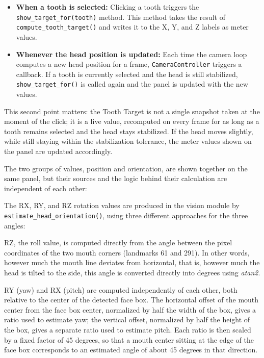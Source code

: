 \begin{itemize}
    \item \textbf{When a tooth is selected:} Clicking a tooth triggers the \texttt{show\_target\_for(tooth)} method. This method takes the result of \texttt{compute\_tooth\_target()} and writes it to the X, Y, and Z labels as meter values.
    \item \textbf{Whenever the head position is updated:} Each time the camera loop computes a new head position for a frame, \texttt{CameraController} triggers a callback. If a tooth is currently selected and the head is still stabilized, \texttt{show\_target\_for()} is called again and the panel is updated with the new values.
\end{itemize}

This second point matters: the Tooth Target is not a single snapshot taken at the moment of the click; it is a live value, recomputed on every frame for as long as a tooth remains selected and the head stays stabilized. If the head moves slightly, while still staying within the stabilization tolerance, the meter values shown on the panel are updated accordingly.

The two groups of values, position and orientation, are shown together on the same panel, but their sources and the logic behind their calculation are independent of each other:

The RX, RY, and RZ rotation values are produced in the vision module by \texttt{estimate\_head\_orientation()}, using three different approaches for the three angles:

RZ, the roll value, is computed directly from the angle between the pixel coordinates of the two mouth corners (landmarks 61 and 291). In other words, however much the mouth line deviates from horizontal, that is, however much the head is tilted to the side, this angle is converted directly into degrees using \textit{atan2}.

RY (yaw) and RX (pitch) are computed independently of each other, both relative to the center of the detected face box. The horizontal offset of the mouth center from the face box center, normalized by half the width of the box, gives a ratio used to estimate yaw; the vertical offset, normalized by half the height of the box, gives a separate ratio used to estimate pitch. Each ratio is then scaled by a fixed factor of 45 degrees, so that a mouth center sitting at the edge of the face box corresponds to an estimated angle of about 45 degrees in that direction. 

